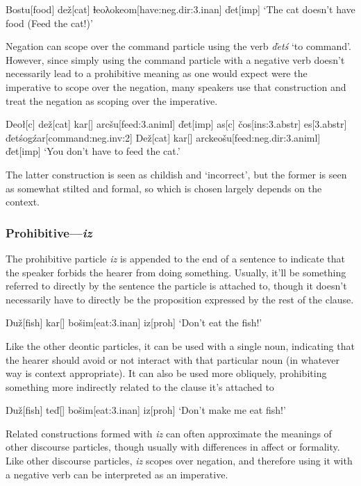 \documentclass[a4paper,11pt,oneside,openany]{memoir}
\newcommand{\vd}{ď}
\newcommand{\vc}{č}
\newcommand{\vz}{ž}
\newcommand{\vs}{š}
\newcommand{\Engma}{Ŋ}
\newcommand{\dbl}{ⱡ}
\newcommand{\lam}{λ}
\begin{document}
\ex 
\begingl
Bostu[food]
de\vz[cat]
\dbl eo\lam okeom[have:{\sc neg.dir:3.inan}]
\vd et[\sc imp]
\glft `The cat doesn't have food (Feed the cat!)'
\endgl
\xe

Negation can scope over the command particle using the verb \textit{\vd et\'s} `to command'. However, since simply using the command particle with a negative verb doesn't necessarily lead to a prohibitive meaning as one would expect were the imperative to scope over the negation, many speakers use that construction and treat the negation as scoping over the imperative.

\pex
\a 
\begingl
Deo\l[\sc c]
de\vz[cat]
kar[]
arc\vs u[feed:{\sc 3.animl}]
\vd et[\sc imp]
\nogloss{,}
as[\sc c]
\vc os[\sc ins:3.abstr]
es[\sc 3.abstr]
\vd et\'sog\'zar[command:{\sc neg.inv:2}]
\endgl
\a {}
\begingl
De\vz[cat]
kar[]
arckeo\vs u[feed:{\sc neg.dir:3.animl}]
\vd et[\sc imp]
\glft `You don't have to feed the cat.'
\endgl
\xe 

The latter construction is seen as childish and `incorrect', but the former is seen as somewhat stilted and formal, so which is chosen largely depends on the context.

\subsubsection{Prohibitive---\textit{iz}}

The prohibitive particle \textit{iz} is appended to the end of a sentence to indicate that the speaker forbids the hearer from doing something. Usually, it'll be something referred to directly by the sentence the particle is attached to, though it doesn't necessarily have to directly be the proposition expressed by the rest of the clause.

\ex 
\begingl
\Engma u\vz[fish]
kar[]
bo\vs im[eat:{\sc 3.inan}]
iz[\sc proh]
\glft `Don't eat the fish!'
\endgl
\xe 

Like the other deontic particles, it can be used with a single noun, indicating that the hearer should avoid or not interact with that particular noun (in whatever way is context appropriate). It can also be used more obliquely, prohibiting something more indirectly related to the clause it's attached to

\ex
\begingl
\Engma u\vz[fish]
te\vd[]
bo\vs im[eat:{\sc 3.inan}]
iz[\sc proh]
\glft `Don't make me eat fish!'
\endgl
\xe

Related constructions formed with \textit{iz} can often approximate the meanings of other discourse particles, though usually with differences in affect or formality. Like other discourse particles, \textit{iz} scopes over negation, and therefore using it with a negative verb can be interpreted as an imperative. 
\end{document}
